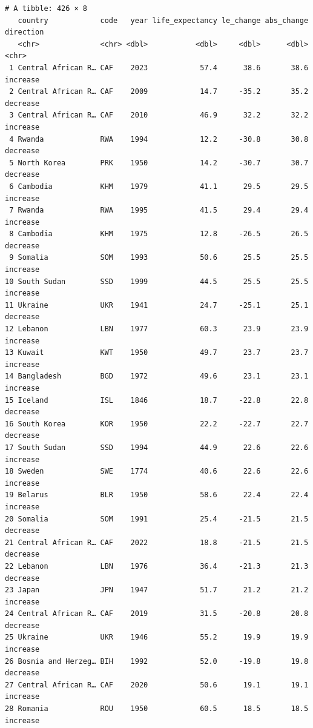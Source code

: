 \documentclass[
  11pt,
]{article}
\newenvironment{rpoutput}{\vspace{0.5em}\begin{snugshade}}{\end{snugshade}}
\begin{document}
\begin{rpoutput}

\begin{verbatim}
# A tibble: 426 × 8
   country            code   year life_expectancy le_change abs_change direction
   <chr>              <chr> <dbl>           <dbl>     <dbl>      <dbl> <chr>    
 1 Central African R… CAF    2023            57.4      38.6       38.6 increase 
 2 Central African R… CAF    2009            14.7     -35.2       35.2 decrease 
 3 Central African R… CAF    2010            46.9      32.2       32.2 increase 
 4 Rwanda             RWA    1994            12.2     -30.8       30.8 decrease 
 5 North Korea        PRK    1950            14.2     -30.7       30.7 decrease 
 6 Cambodia           KHM    1979            41.1      29.5       29.5 increase 
 7 Rwanda             RWA    1995            41.5      29.4       29.4 increase 
 8 Cambodia           KHM    1975            12.8     -26.5       26.5 decrease 
 9 Somalia            SOM    1993            50.6      25.5       25.5 increase 
10 South Sudan        SSD    1999            44.5      25.5       25.5 increase 
11 Ukraine            UKR    1941            24.7     -25.1       25.1 decrease 
12 Lebanon            LBN    1977            60.3      23.9       23.9 increase 
13 Kuwait             KWT    1950            49.7      23.7       23.7 increase 
14 Bangladesh         BGD    1972            49.6      23.1       23.1 increase 
15 Iceland            ISL    1846            18.7     -22.8       22.8 decrease 
16 South Korea        KOR    1950            22.2     -22.7       22.7 decrease 
17 South Sudan        SSD    1994            44.9      22.6       22.6 increase 
18 Sweden             SWE    1774            40.6      22.6       22.6 increase 
19 Belarus            BLR    1950            58.6      22.4       22.4 increase 
20 Somalia            SOM    1991            25.4     -21.5       21.5 decrease 
21 Central African R… CAF    2022            18.8     -21.5       21.5 decrease 
22 Lebanon            LBN    1976            36.4     -21.3       21.3 decrease 
23 Japan              JPN    1947            51.7      21.2       21.2 increase 
24 Central African R… CAF    2019            31.5     -20.8       20.8 decrease 
25 Ukraine            UKR    1946            55.2      19.9       19.9 increase 
26 Bosnia and Herzeg… BIH    1992            52.0     -19.8       19.8 decrease 
27 Central African R… CAF    2020            50.6      19.1       19.1 increase 
28 Romania            ROU    1950            60.5      18.5       18.5 increase 

\end{verbatim}
\end{rpoutput}
\end{document}
